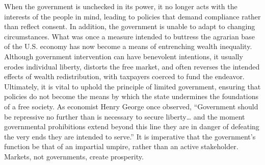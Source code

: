 \documentclass[12pt, a4paper, twoside]{article}
\begin{document}
When the government is unchecked in its power, it no longer acts with the interests of the people in mind, leading to policies that demand compliance rather than reflect consent. In addition, the government is unable to adapt to changing circumstances. What was once a measure intended to buttress the agrarian base of the U.S. economy has now become a means of entrenching wealth inequality. Although government intervention can have benevolent intentions, it usually erodes individual liberty, distorts the free market, and often reverses the intended effects of wealth redistribution, with taxpayers coerced to fund the endeavor. Ultimately, it is vital to uphold the principle of limited government, ensuring that policies do not become the means by which the state undermines the foundations of a free society. As economist Henry George once observed, “Government should be repressive no further than is necessary to secure liberty… and the moment governmental prohibitions extend beyond this line they are in danger of defeating the very ends they are intended to serve.” It is imperative that the government’s function be that of an impartial umpire, rather than an active stakeholder. Markets, not governments, create prosperity. 


\nocite{*}
\printbibliography[title={References}]
\end{document}
